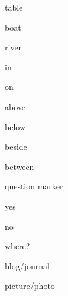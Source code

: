 \begin{flashcard}{\LARGE table}
\LARGE {}
\end{flashcard}
\begin{flashcard}{\LARGE boat}
\LARGE {}
\end{flashcard}
\begin{flashcard}{\LARGE river}
\LARGE {}
\end{flashcard}
\begin{flashcard}{\LARGE in}
\LARGE {}
\end{flashcard}
\begin{flashcard}{\LARGE on}
\LARGE {}
\end{flashcard}
\begin{flashcard}{\LARGE above}
\LARGE {}
\end{flashcard}
\begin{flashcard}{\LARGE below}
\LARGE {}
\end{flashcard}
\begin{flashcard}{\LARGE beside}
\LARGE {}
\end{flashcard}
\begin{flashcard}{\LARGE between}
\LARGE {}
\end{flashcard}
\begin{flashcard}{\LARGE question marker}
\LARGE {}
\end{flashcard}
\begin{flashcard}{\LARGE yes}
\LARGE {}
\end{flashcard}
\begin{flashcard}{\LARGE no}
\LARGE {}
\end{flashcard}
\begin{flashcard}{\LARGE where?}
\LARGE {}
\end{flashcard}
\begin{flashcard}{\LARGE blog/journal}
\LARGE {}
\end{flashcard}
\begin{flashcard}{\LARGE picture/photo}
\LARGE {}
\end{flashcard}
